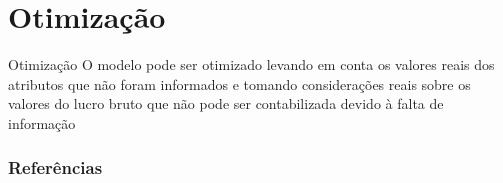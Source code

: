 \documentclass[compress]{beamer}
\begin{document}
\section{Otimização}
\begin{frame}{Otimização}
    O modelo pode ser otimizado levando em conta os valores reais dos atributos que não foram informados e tomando considerações reais sobre os valores do lucro bruto que não pode ser contabilizada devido à falta de informação
\end{frame}





\begin{frame}[allowframebreaks]
\frametitle{Referências}


\end{frame}
\end{document}
